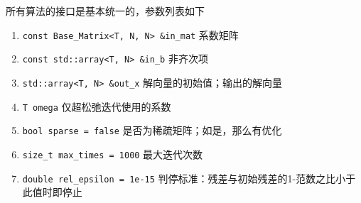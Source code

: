 所有算法的接口是基本统一的，参数列表如下\begin{enumerate}
    \item \verb|const Base_Matrix<T, N, N> &in_mat| 系数矩阵
    \item \verb|const std::array<T, N> &in_b| 非齐次项
    \item \verb|std::array<T, N> &out_x| 解向量的初始值；输出的解向量
    \item \verb|T omega| 仅超松弛迭代使用的系数
    \item \verb|bool sparse = false| 是否为稀疏矩阵；如是，那么有优化
    \item \verb|size_t max_times = 1000| 最大迭代次数
    \item \verb|double rel_epsilon = 1e-15| 判停标准：残差与初始残差的1-范数之比小于此值时即停止
\end{enumerate}
